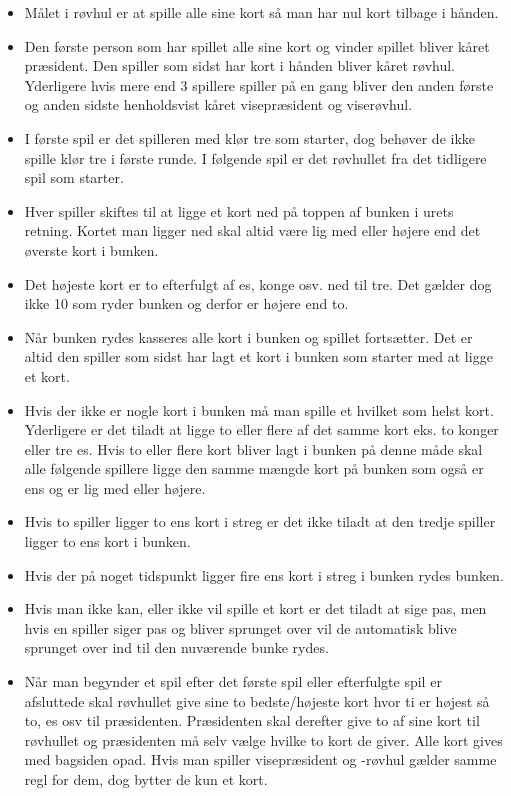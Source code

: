 \documentclass[a4paper, 12pt]{article}
\begin{document}
\begin{itemize}
	\item Målet i røvhul er at spille alle sine kort så man har nul kort tilbage i hånden.
	\item Den første person som har spillet alle sine kort og vinder spillet bliver kåret præsident. Den spiller som sidst har kort i hånden bliver kåret røvhul. Yderligere hvis mere end 3 spillere spiller på en gang bliver den anden første og anden sidste henholdsvist kåret visepræsident og viserøvhul.
	\item I første spil er det spilleren med klør tre som starter, dog behøver de ikke spille klør tre i første runde. I følgende spil er det røvhullet fra det tidligere spil som starter.
	\item Hver spiller skiftes til at ligge et kort ned på toppen af bunken i urets retning. Kortet man ligger ned skal altid være lig med eller højere end det øverste kort i bunken. 
	\item Det højeste kort er to efterfulgt af es, konge osv. ned til tre. Det gælder dog ikke 10 som ryder bunken og derfor er højere end to.
	\item Når bunken rydes kasseres alle kort i bunken og spillet fortsætter. Det er altid den spiller som sidst har lagt et kort i bunken som starter med at ligge et kort.
	\item Hvis der ikke er nogle kort i bunken må man spille et hvilket som helst kort. Yderligere er det tiladt at ligge to eller flere af det samme kort eks. to konger eller tre es. Hvis to eller flere kort bliver lagt i bunken på denne måde skal alle følgende spillere ligge den samme mængde kort på bunken som også er ens og er lig med eller højere.
	\item Hvis to spiller ligger to ens kort i streg er det ikke tiladt at den tredje spiller ligger to ens kort i bunken.
	\item Hvis der på noget tidspunkt ligger fire ens kort i streg i bunken rydes bunken.
	\item Hvis man ikke kan, eller ikke vil spille et kort er det tiladt at sige pas, men hvis en spiller siger pas og bliver sprunget over vil de automatisk blive sprunget over ind til den nuværende bunke rydes.
	\item Når man begynder et spil efter det første spil eller efterfulgte spil er afsluttede skal røvhullet give sine to bedste/højeste kort hvor ti er højest så to, es osv til præsidenten. Præsidenten skal derefter give to af sine kort til røvhullet og præsidenten må selv vælge hvilke to kort de giver. Alle kort gives med bagsiden opad. Hvis man spiller visepræsident og -røvhul gælder samme regl for dem, dog bytter de kun et kort. 
\end{itemize}
\end{document}
